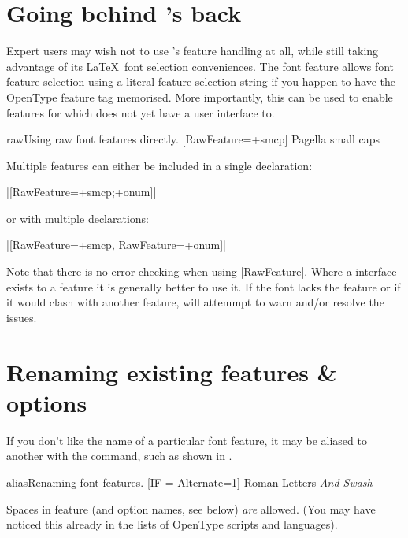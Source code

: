\documentclass[a4paper]{l3doc}
\begin{document}
\section{Going behind 's back}

Expert users may wish not to use 's feature handling at all,
while still taking advantage of its \LaTeX\ font selection conveniences. The
 font feature allows font feature selection using a literal feature
selection string if you happen to have the OpenType feature tag memorised.
More importantly, this can be used to enable features for which 
does not yet have a user interface to.

\begin{Xexample}{raw}{Using raw font features directly.}
  [RawFeature=+smcp]
  Pagella small caps
\end{Xexample}

Multiple features can either be included in a single declaration:\par
{\centering|[RawFeature=+smcp;+onum]|\par}
\noindent or with multiple declarations:\par
{\centering|[RawFeature=+smcp, RawFeature=+onum]|\par}

Note that there is no error-checking when using |RawFeature|. Where a 
interface exists to a feature it is generally better to use it. If the font lacks the feature
or if it would clash with another feature,  will attemmpt to warn and/or resolve the issues.


\section{Renaming existing features \& options}
\label{sec:aliasfontfeature}

\DescribeMacro{\aliasfontfeature}
If you don't like the name of a particular font feature,
it may be aliased to another with the
 command,
such as shown in .

\begin{Xexample}{alias}{Renaming font features.}
  [IF = {Alternate=1}]
  Roman Letters \itshape And Swash
\end{Xexample}

Spaces in feature (and option names, see below) \emph{are} allowed. (You may have
noticed this already in the lists of OpenType scripts and languages).
\end{document}
